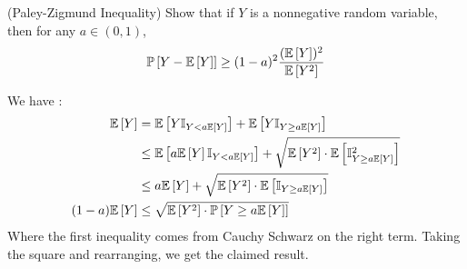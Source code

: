 \begin{exercise}{(Paley-Zigmund Inequality)}
	Show that if $ Y $ is a nonnegative random variable, then for any $ a \in (0,1) $,
\begin{equation*}
	\PP{Y- \EE{Y}} \geq (1-a)^2 \frac{(\EE{Y})^2}{\EE{Y^2}}
\end{equation*}

\end{exercise}

\begin{solution}
	We have :
\begin{align*}
	\EE{Y} &= \EE{Y \mathbb{I}_{Y<a\EE{Y}}} + \EE{Y \mathbb{I}_{Y \geq a\EE{Y}}} \\
	       &\leq \EE{a\EE{Y} \mathbb{I}_{Y<a\EE{Y}}} + \sqrt{\EE{Y^2}\cdot \EE{\mathbb{I}_{Y\geq a \EE{Y}}^2}} \\
	       &\leq a\EE{Y} + \sqrt{\EE{Y^2}\cdot \EE{\mathbb{I}_{Y\geq a \EE{Y}}}} \\
	(1-a)\EE{Y} &\leq \sqrt{\EE{Y^2}\cdot \PP{Y\geq a \EE{Y}}} \\
\end{align*}
Where the first inequality comes from Cauchy Schwarz on the right term.
Taking the square and rearranging, we get the claimed result.

\end{solution}
